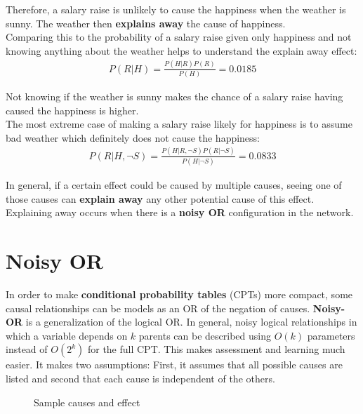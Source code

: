 \documentclass{report}
\begin{document}
Therefore, a salary raise is unlikely to cause the happiness when the weather is sunny. The weather then {\bf explains away} the cause of happiness.
\\
Comparing this to the probability of a salary raise given only happiness and not knowing anything about the weather helps to understand the explain away effect:
\begin{align*}
P(R\vert H) = \frac{P(H\vert R)P(R)}{P(H)} = 0.0185
\end{align*}

Not knowing if the weather is sunny makes the chance of a salary raise having caused the happiness is higher.
\\
The most extreme case of making a salary raise likely for happiness is to assume bad weather which definitely does not cause the happiness:
\begin{align*}
P(R\vert H,\neg S) = \frac{P(H\vert R, \neg S)P(R\vert \neg S)}{P(H\vert \neg S)} = 0.0833
\end{align*}

In general, if a certain effect could be caused by multiple causes, seeing one of those causes can {\bf explain away} any other potential cause of this effect.
Explaining away occurs when there is a {\bf noisy OR} configuration in the network.


\section{Noisy OR}
In order to make {\bf conditional probability tables} (CPTs) more compact, some causal relationships can be models as an OR of the negation of causes. {\bf Noisy-OR} is a generalization of the logical OR.
In general, noisy logical relationships in which a variable depends on $k$ parents can be described using $O(k)$ parameters instead of $O(2^k)$ for the full CPT.
This makes assessment and learning much easier.
It makes two assumptions: First, it assumes that all possible causes are listed and second that each cause is independent of the others.

\begin{figure}[h!]
\centering
{}
\caption{Sample causes and effect}
\label{figure:noisyor}
\end{figure}
\end{document}
